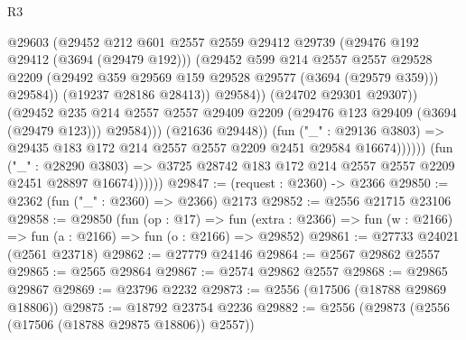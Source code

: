\begin{lexlean}{R3}
\begin{coremodule}
                                      @29603
                                      (@29452
                                        @212
                                        @601
                                        @2557
                                        @2559
                                        @29412
                                        @29739
                                        (@29476 @192 @29412 (@3694 (@29479 @192)))
                                        (@29452
                                          @599
                                          @214
                                          @2557
                                          @2557
                                          @29528
                                          @2209
                                          (@29492
                                            @359
                                            @29569
                                            @159
                                            @29528
                                            @29577
                                            (@3694 (@29579 @359)))
                                          @29584))
                                      (@19237 @28186 @28413))
                                    @29584))
                                (@24702 @29301 @29307))
                              (@29452
                                @235
                                @214
                                @2557
                                @2557
                                @29409
                                @2209
                                (@29476 @123 @29409 (@3694 (@29479 @123)))
                                @29584)))
                          (@21636 @29448))
                        (fun ("_" : @29136 @3803) =>
                        @29435 @183 @172 @214 @2557 @2557 @2209 @2451 @29584 @16674))))))
              (fun ("_" : @28290 @3803) =>
              @3725 @28742 @183 @172 @214 @2557 @2557 @2209 @2451 @28897 @16674))))))
@29847 := (request : @2360) -> @2366
@29850 := @2362 (fun ("_" : @2360) => @2366) @2173
@29852 := @2556 @21715 @23106
@29858 := @29850
    (fun (op : @17) =>
    fun (extra : @2366) => fun (w : @2166) => fun (a : @2166) => fun (o : @2166) => @29852)
@29861 := @27733 @24021 (@2561 @23718)
@29862 := @27779 @24146
@29864 := @2567 @29862 @2557
@29865 := @2565 @29864
@29867 := @2574 @29862 @2557
@29868 := @29865 @29867
@29869 := @23796 @2232
@29873 := @2556 (@17506 (@18788 @29869 @18806))
@29875 := @18792 @23754 @2236
@29882 := @2556 (@29873 (@2556 (@17506 (@18788 @29875 @18806)) @2557))

\end{coremodule}
\end{lexlean}

